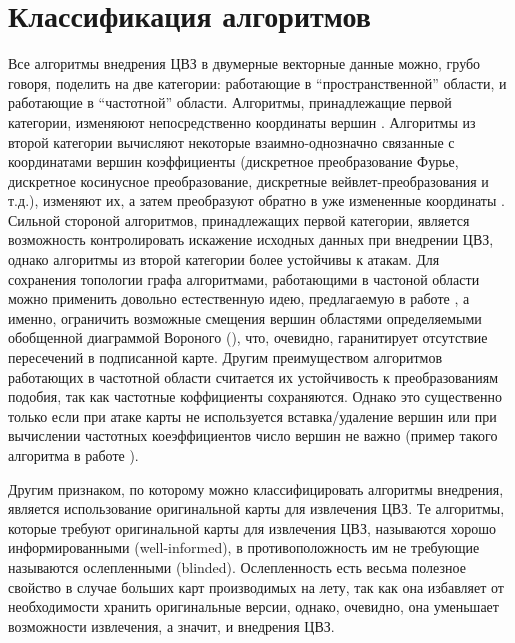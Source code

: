 \section{Классификация алгоритмов}
\label{sec:classification}
Все алгоритмы внедрения ЦВЗ в двумерные векторные данные можно, грубо говоря, поделить на две категории: 
работающие в ``пространственной'' области, и работающие в ``частотной'' области. 
Алгоритмы, принадлежащие первой категории, изменяюют непосредственно 
координаты вершин \cite{Kim, Chang, Bazin}. Алгоритмы из второй категории вычисляют некоторые 
взаимно-однозначно связанные с координатами вершин коэффициенты (дискретное преобразование Фурье, 
дискретное косинусное преобразование, дискретные вейвлет-преобразования и т.д.), изменяют их, а затем 
преобразуют обратно в уже измененные координаты \cite{Voight, Ohbuchi, Ohbuchi3D, Praun}.  
Сильной стороной алгоритмов, принадлежащих первой категории, является возможность контролировать искажение
исходных данных при внедрении ЦВЗ, однако алгоритмы из второй категории более устойчивы к атакам.
Для сохранения топологии графа алгоритмами, работающими в частоной области можно применить довольно естественную идею,
предлагаемую в работе \cite{Huber}, а именно, ограничить 
возможные смещения вершин областями определяемыми обобщенной диаграммой Вороного (\cite{Held}), что, очевидно,
гаранитирует отсутствие пересечений в подписанной карте. 
Другим преимуществом алгоритмов работающих в частотной области считается их устойчивость к преобразованиям
подобия, так как частотные коффициенты сохраняются.
Однако это существенно только если при атаке карты не используется вставка/удаление вершин или 
при вычислении частотных коеэффициентов число вершин не важно (пример такого алгоритма в работе \cite{Shao}). 

Другим признаком, по которому можно классифицировать алгоритмы внедрения, является использование 
оригинальной карты для извлечения ЦВЗ. Те алгоритмы, которые требуют оригинальной карты для извлечения ЦВЗ,
называются хорошо информированными (well-informed), в противоположность им не требующие называются ослепленными
(blinded). Ослепленность есть весьма полезное свойство в случае больших карт производимых на лету, 
так как она избавляет от необходимости хранить оригинальные версии, однако, очевидно, она уменьшает возможности
извлечения, а значит, и внедрения ЦВЗ.
